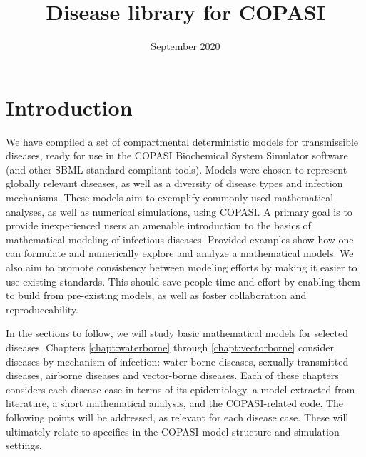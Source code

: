 \documentclass{book}
\title{Disease library for COPASI}
\author{}
\date{September 2020}
\begin{document}
\maketitle

\tableofcontents

\chapter{Introduction}
\label{chapt:intro}


We have compiled a set of compartmental deterministic models for transmissible diseases, ready for use in the COPASI Biochemical System Simulator software (and other SBML standard compliant tools). Models were chosen to represent globally relevant diseases, as well as a diversity of disease types and infection mechanisms. These models aim to exemplify commonly used mathematical analyses, as well as numerical simulations, using COPASI. A primary goal is to provide inexperienced users an amenable introduction to the basics of mathematical modeling of infectious diseases. Provided examples show how one can formulate and numerically explore and analyze a mathematical models. We also aim to promote consistency between modeling efforts by making it easier to use existing standards. This should save people time and effort by enabling them to build from pre-existing models, as well as foster collaboration and reproduceability.

In the sections to follow, we will study basic mathematical models for selected diseases. Chapters \ref{chapt:waterborne} through \ref{chapt:vectorborne} consider diseases by mechanism of infection: water-borne diseases, sexually-transmitted diseases, airborne diseases and vector-borne diseases. Each of these chapters considers each disease case in terms of its epidemiology, a model extracted from literature, a short mathematical analysis, and the COPASI-related code. The following points will be addressed, as relevant for each disease case. These will ultimately relate to specifics in the COPASI model structure and simulation settings.
\end{document}
